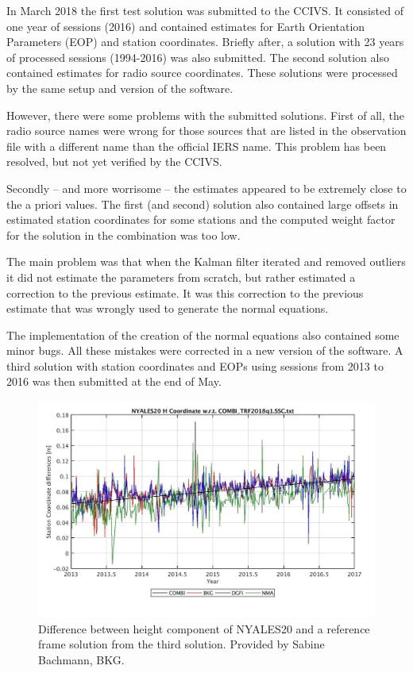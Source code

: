 \documentclass[twocolumn,twoside]{svmultivs_gm} %
\begin{document}
In March 2018 the first test solution was submitted to the CCIVS. It consisted of one year of
sessions (2016) and contained estimates for Earth Orientation Parameters (EOP) and station coordinates. Briefly after, a
solution with 23 years of processed sessions (1994-2016) was also submitted. The second solution also contained estimates for radio
source coordinates. These solutions were processed by the same setup and version of the software.

However, there were some problems with the submitted solutions. First of all, the radio source names were wrong for
those sources that are listed in the observation file with a different name than the official IERS name. This problem
has been resolved, but not yet verified by the CCIVS.

Secondly -- and more worrisome -- the estimates appeared to be extremely close to the a priori values. The first (and 
second) solution also contained large offsets in estimated station coordinates for some stations and the computed weight
 factor for the solution in the combination was too low.

The main problem was that when the Kalman filter iterated and removed outliers it did not estimate the parameters from
scratch, but rather estimated a correction to the previous estimate. It was this correction to the previous estimate 
that was wrongly used to generate the normal equations.

The implementation of the creation of the normal equations also contained some minor bugs. All these mistakes were
corrected in a new version of the software. A third solution with station coordinates and EOPs using sessions from 2013
to 2016 was then submitted at the end of May.

\begin{figure}[!htbp]
\includegraphics[width=\linewidth]{kirkvik02}
\caption{Difference between height component of NYALES20 and a reference frame solution from the third solution.
Provided by Sabine Bachmann, BKG.}
\label{fig:bad_nyal_h}
\end{figure} 
\end{document}
